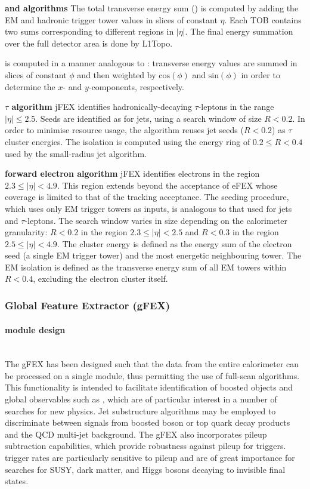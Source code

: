 \documentclass[cernpreprint, atlasdraft=false, UKenglish,british,orcidlogo, texmf, orcidlogo]{atlasdoc}
\begin{document}
\textbf{ \MET and \sumET algorithms}
The total transverse energy sum (\sumET) is computed by adding the \gls{EM} and hadronic trigger tower \ET values in slices of constant $\eta$.  Each \sumET \gls{TOB} contains two sums corresponding to different regions in $|\eta|$.  The final energy summation over the full detector area is done by \gls{L1Topo}.
 
\MET is computed in a manner analogous to \sumET: transverse energy values are summed in slices of constant $\phi$ and then weighted by $\mathrm{cos}(\phi)$ and $\mathrm{sin}(\phi)$ in order to determine the $x$- and $y$-components, respectively.
 
\textbf{ $\tau$ algorithm}
\gls{jFEX} identifies hadronically-decaying $\tau$-leptons in the range $|\eta| \leq 2.5$.  Seeds are identified as for jets, using a search window of size $R < 0.2$.  In order to minimise resource usage, the algorithm reuses jet seeds ($R < 0.2$) as $\tau$ cluster energies.  The isolation is computed using the energy ring of $0.2 \leq R < 0.4$ used by the small-radius jet algorithm.
 
\textbf{ forward electron algorithm}
\gls{jFEX} identifies electrons in the region $2.3 \leq |\eta| < 4.9$.  This region extends beyond the acceptance of \gls{eFEX} whose coverage is limited to that of the tracking acceptance.   The seeding procedure, which uses only \gls{EM} trigger towers as inputs, is analogous to that used for jets and $\tau$-leptons.  The search window varies in size depending on the calorimeter granularity: $R < 0.2$ in the region $2.3 \leq |\eta| < 2.5$ and $R < 0.3$ in the region $2.5 \leq |\eta| < 4.9$.  The cluster energy is defined as the energy sum of the electron seed (a single \gls{EM} trigger tower) and the most energetic neighbouring tower.  The \gls{EM} isolation is defined as the transverse energy sum of all \gls{EM} towers within $R < 0.4$, excluding the electron cluster itself.
 
\subsubsection{Global Feature Extractor (gFEX)}\label{sec:TDAQ_gFEX}
\paragraph{ module design}\mbox{}\\
The \gls{gFEX} has been designed such that the data from the entire calorimeter can be processed on a single module, thus permitting the use of full-scan algorithms.  This functionality is intended to facilitate identification of boosted objects and global observables such as \MET, which are of particular interest in a number of searches for new physics. Jet substructure algorithms may be employed to discriminate between signals from boosted boson or top quark decay products and the \gls{QCD} multi-jet background.  The \gls{gFEX} also incorporates pileup subtraction capabilities, which provide robustness against pileup for \MET triggers.  \MET trigger rates are particularly sensitive to pileup and are of great importance for searches for \gls{SUSY}, dark matter, and Higgs bosons decaying to invisible final states.
 
\end{document}
